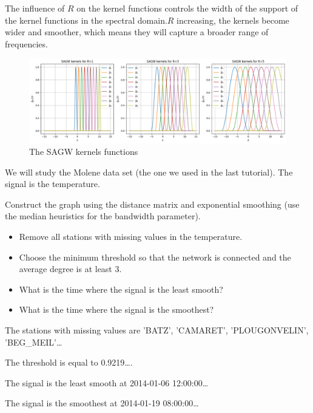 \documentclass[11pt]{article}
\begin{document}
\begin{solution}
The influence of $R$ on the kernel functions controls the width of the support of the kernel functions in the spectral domain.$R$ increasing, the kernels become wider and smoother, which means they will capture a broader range of frequencies.
\begin{figure}
    \centering
    \begin{minipage}[t]{1\textwidth}
    \centerline{\includegraphics[width=\textwidth]{output.png}}
    \end{minipage}

    \caption{The SAGW kernels functions}\label{fig:sagw-kernels}
\end{figure}
\end{solution}


\newpage
We will study the Molene data set (the one we used in the last tutorial).
The signal is the temperature.

\begin{exercise}
Construct the graph using the distance matrix and exponential smoothing (use the median heuristics for the bandwidth parameter). 
\begin{itemize}
    \item Remove all stations with missing values in the temperature.
    \item Choose the minimum threshold so that the network is connected and the average degree is at least 3.
    \item What is the time where the signal is the least smooth?
    \item What is the time where the signal is the smoothest?
\end{itemize}
\end{exercise}

\begin{solution}
The stations with missing values are 'BATZ', 'CAMARET', 'PLOUGONVELIN', 'BEG_MEIL'\dots

The threshold is equal to 0.9219\dots.

The signal is the least smooth at 2014-01-06 12:00:00\dots

The signal is the smoothest at 2014-01-19 08:00:00\dots

\end{solution}
\end{document}

